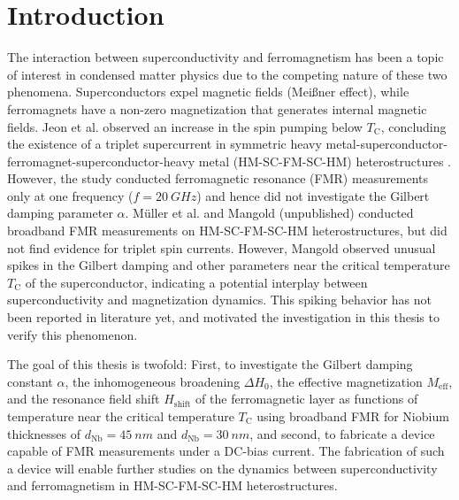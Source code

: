 \chapter{Introduction} The interaction between superconductivity and ferromagnetism has been a topic of interest in condensed matter physics due to the competing nature of these two phenomena. Superconductors expel magnetic fields (Meißner effect), while ferromagnets have a non-zero magnetization that generates internal magnetic fields. Jeon et al. observed an increase in the spin pumping below $T_\textrm{C}$, concluding the existence of a triplet supercurrent in symmetric heavy metal-superconductor-ferromagnet-superconductor-heavy metal (HM-SC-FM-SC-HM) heterostructures \cite{Jeon2018}. However, the study conducted ferromagnetic resonance (FMR) measurements only at one frequency ($f = \SI{20}{GHz}$) and hence did not investigate the Gilbert damping parameter $\alpha$. Müller et al. \cite{muller2021temperature} and Mangold (unpublished) conducted broadband FMR measurements on HM-SC-FM-SC-HM heterostructures, but did not find evidence for triplet spin currents. However, Mangold observed unusual spikes in the Gilbert damping and other parameters near the critical temperature $T_\textrm{C}$ of the superconductor, indicating a potential interplay between superconductivity and magnetization dynamics. This spiking behavior has not been reported in literature yet, and motivated the investigation in this thesis to verify this phenomenon.

The goal of this thesis is twofold: First, to investigate the Gilbert damping constant $\alpha$, the inhomogeneous broadening $\Delta H_0$, the effective magnetization $M_\textrm{eff}$, and the resonance field shift $H_\textrm{shift}$ of the ferromagnetic layer as functions of temperature near the critical temperature $T_\textrm{C}$ using broadband FMR for Niobium thicknesses of $d_\textrm{Nb} = \SI{45}{nm}$ and $d_\textrm{Nb} = \SI{30}{nm}$, and second, to fabricate a device capable of FMR measurements under a DC-bias current. The fabrication of such a device will enable further studies on the dynamics between superconductivity and ferromagnetism in HM-SC-FM-SC-HM heterostructures.
